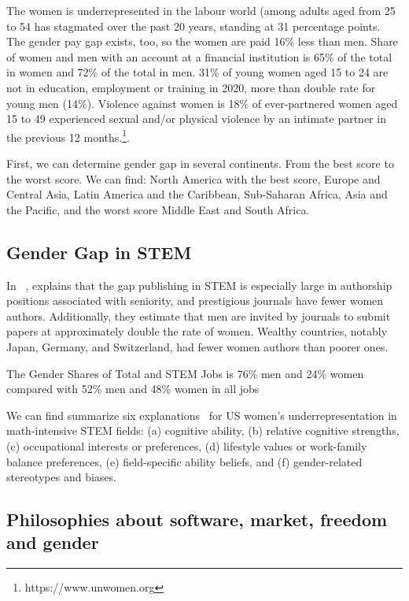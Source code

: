 \documentclass[fleqn,10pt,lineno]{wlpeerj} %
\begin{document}
The women is underrepresented in the labour world (among adults aged
from 25 to 54 has stagmated over the past 20 years, standing at 31
percentage points. The gender pay gap exists, too, so the women are
paid 16\% less than men. Share of women and men with an account at a
financial institution is 65\% of the total in women and 72\% of the
total in men. 31\% of young women aged 15 to 24 are not in education,
employment or training in 2020, more than double rate for young men
(14\%). Violence against women is 18\% of ever-partnered women aged 15
to 49 experienced sexual and/or physical violence by an intimate
partner in the previous 12 months.\footnote{https://www.unwomen.org}.

First, we can determine gender gap in several continents. From the
best score to the worst score. We can find: North America with the
best score, Europe and Central Asia, Latin America and the Caribbean,
Sub-Saharan Africa, Asia and the Pacific, and the worst score Middle
East and South Africa.~\cite{hausmann2012global}

\subsection*{Gender Gap in STEM}

In ~\cite{holman2018gender}, explains that the gap publishing in STEM
is especially large in authorship positions associated with seniority,
and prestigious journals have fewer women authors. Additionally, they
estimate that men are invited by journals to submit papers at
approximately double the rate of women. Wealthy countries, notably
Japan, Germany, and Switzerland, had fewer women authors than poorer
ones.

The Gender Shares of Total and STEM Jobs is 76\% men and 24\% women
compared with 52\% men and 48\% women in all jobs
~\cite{beede2011women}

We can find summarize six explanations~\cite{wang2017gender} for US
women’s underrepresentation in math-intensive STEM fields: (a)
cognitive ability, (b) relative cognitive strengths, (c) occupational
interests or preferences, (d) lifestyle values or work-family balance
preferences, (e) field-specific ability beliefs, and (f)
gender-related stereotypes and biases.

\subsection*{Philosophies about software, market, freedom and gender}
\end{document}
